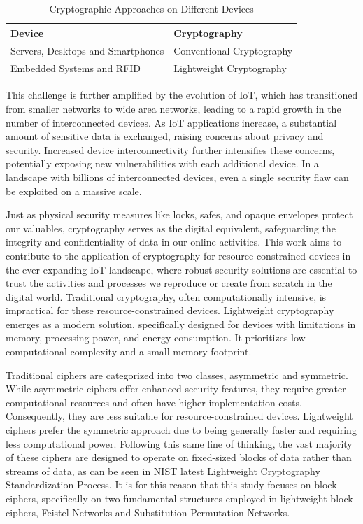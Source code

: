 \documentclass[conference]{IEEEtran}
\begin{document}
\begin{table}[ht]
    \centering
    \caption{Cryptographic Approaches on Different Devices\cite{IoT_1}}
    \begin{tabular}{ll}
        \toprule
        \textbf{Device} & \textbf{Cryptography} \\
        \midrule
        Servers, Desktops and Smartphones & Conventional Cryptography \\
        Embedded Systems and RFID & Lightweight Cryptography \\
        \bottomrule
    \end{tabular}
    \label{table:crypto_devices}
\end{table}

This challenge is further amplified by the evolution of IoT, which has transitioned from smaller networks to wide area networks, leading to a rapid growth in the number of interconnected devices. As IoT applications increase, a substantial amount of sensitive data is exchanged, raising concerns about privacy and security. Increased device interconnectivity further intensifies these concerns, potentially exposing new vulnerabilities with each additional device. In a landscape with billions of interconnected devices, even a single security flaw can be exploited on a massive scale.

Just as physical security measures like locks, safes, and opaque envelopes protect our valuables, cryptography serves as the digital equivalent, safeguarding the integrity and confidentiality of data in our online activities. This work aims to contribute to the application of cryptography for resource-constrained devices in the ever-expanding IoT landscape, where robust security solutions are essential to trust the activities and processes we reproduce or create from scratch in the digital world. 
Traditional cryptography, often computationally intensive, is impractical for these resource-constrained devices.  Lightweight cryptography emerges as a modern solution, specifically designed for devices with limitations in memory, processing power, and energy consumption. It prioritizes low computational complexity and a small memory footprint\cite{zhong2024lightweight}.

Traditional ciphers are categorized into two classes, asymmetric and symmetric. While asymmetric ciphers offer enhanced security features, they require greater computational resources and often have higher implementation costs. Consequently, they are less suitable for resource-constrained devices. Lightweight ciphers prefer the symmetric approach due to being generally faster and requiring less computational power. Following this same line of thinking, the vast majority of these ciphers are designed to operate on fixed-sized blocks of data rather than streams of data, as can be seen in NIST latest Lightweight Cryptography Standardization Process\cite{NIST}. It is for this reason that this study focuses on block ciphers, specifically on two fundamental structures employed in lightweight block ciphers, Feistel Networks and Substitution-Permutation Networks.
\end{document}
